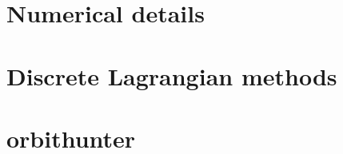 \chapter{Numerical details}
\label{c-numerical}



%
%


\chapter{Discrete Lagrangian methods}
\label{c-dlm}

\chapter{orbithunter}
\label{c-orbithunter}

